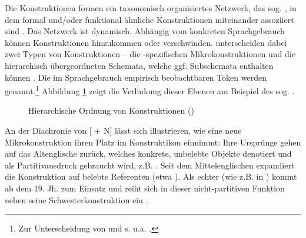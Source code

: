 Die Konstruktionen formen ein taxonomisch organisiertes Netzwerk, das sog.  \parencite{Ziem2013}, in dem formal und/oder funktional ähnliche Konstruktionen miteinander assoziiert sind \parencites()()[]{Langacker1987}[262ff.]{Croft2004}[]{Bybee2010}. Das Netzwerk ist dynamisch. Abhängig vom konkreten Sprachgebrauch können  Konstruktionen hinzukommen oder verschwinden. \textcite[17]{Traugott2013} unterscheiden dabei zwei Typen von Konstruktionen -- die -spezifischen Mikrokonstruktionen und die hierarchisch übergeordneten Schemata, welche ggf. Subschemata enthalten können \parencite[s. auch][]{Traugott2015}. Die im Sprachgebrauch empirisch beobachtbaren Token werden  genannt.\footnote{Zur Unterscheidung von  und  s. u.a. \textcite[][423]{Fried2013}.} Abbildung \ref{abb:quant-schema} zeigt die Verlinkung dieser Ebenen am Beispiel des sog.  \parencite[aus][17]{Traugott2013}. 

\begin{figure}
\begin{center}
\caption {Hierarchische Ordnung von Konstruktionen ()} 
\label{abb:quant-schema}
\end{center}
\end{figure}
 


An der Diachronie von [ + N] lässt sich illustrieren, wie eine neue Mikrokonstruktion ihren Platz im Konstruktikon einnimmt: Ihre Ursprünge gehen auf das Altenglische  zurück, welches konkrete, unbelebte Objekte denotiert und als Partitivausdruck gebraucht wird, z.B.   \parencite[230]{Traugott2008a}. Seit dem Mittelenglischen expandiert die Konstruktion auf  belebte Referenten (etwa ). Als echter  (wie z.B. in  ) kommt  ab dem 19. Jh. zum Einsatz  und reiht sich in dieser nicht-partitiven Funktion neben seine Schwesterkonstruktion  ein \parencite[weiterführend s.][23f.]{Traugott2013}.


